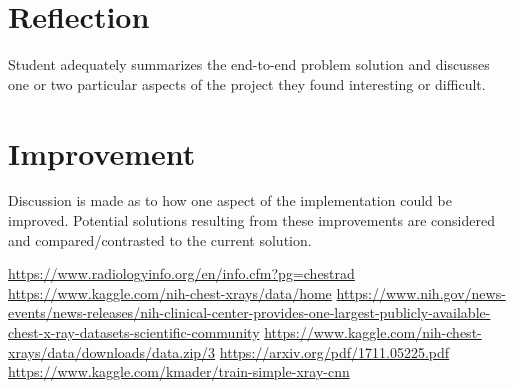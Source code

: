 \documentclass{article}
\begin{document}
    \section{Reflection}
    Student adequately summarizes the end-to-end problem solution and discusses one or two particular aspects of the project they found interesting or difficult.

    \section{Improvement}
    Discussion is made as to how one aspect of the implementation could be improved. Potential solutions resulting from these improvements are considered and compared/contrasted to the current solution.

    \begin{thebibliography}{999}

         \url{https://www.radiologyinfo.org/en/info.cfm?pg=chestrad}
         \url{https://www.kaggle.com/nih-chest-xrays/data/home} 
         \url{https://www.nih.gov/news-events/news-releases/nih-clinical-center-provides-one-largest-publicly-available-chest-x-ray-datasets-scientific-community}
         \url{https://www.kaggle.com/nih-chest-xrays/data/downloads/data.zip/3}
         \url{https://arxiv.org/pdf/1711.05225.pdf}
         \url{https://www.kaggle.com/kmader/train-simple-xray-cnn}

    \end{thebibliography}
\end{document}
